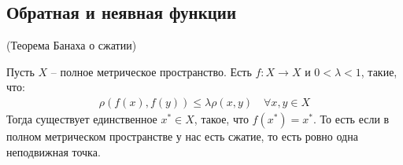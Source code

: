 \subsection{Обратная и неявная функции}
\begin{theorem} (Теорема Банаха о сжатии)

    Пусть $X$ -- полное метрическое пространство. Есть $f: X \longrightarrow X$ и $0 < \lambda < 1$, такие, что:
    \begin{gather*}
        \rho(f(x), f(y)) \leqslant \lambda \rho(x, y) \quad \forall x, y \in X
    \end{gather*}
    Тогда существует единственное $x^* \in X$, такое, что $f(x^*) = x^*$. 
    То есть если в полном метрическом пространстве у нас есть сжатие, то есть ровно одна неподвижная точка. 
\end{theorem}
